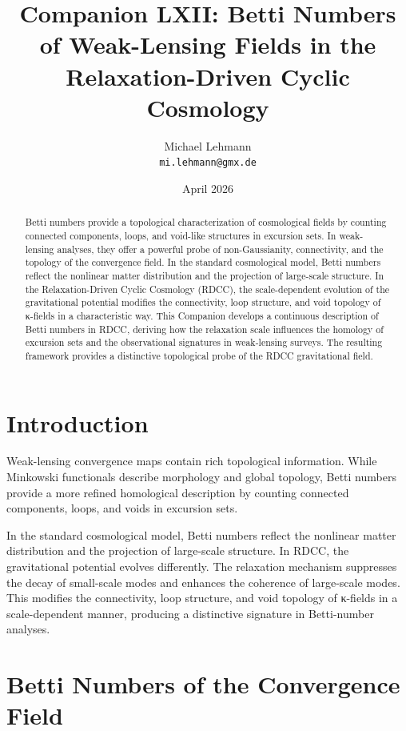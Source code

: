 \documentclass[11pt,a4paper]{article}
\title{\textbf{Companion LXII: Betti Numbers of Weak-Lensing Fields in the Relaxation-Driven Cyclic Cosmology}}
\author{Michael Lehmann \\ \texttt{mi.lehmann@gmx.de}}
\date{April 2026}
\begin{document}
\maketitle

\begin{abstract}
Betti numbers provide a topological characterization of cosmological fields by 
counting connected components, loops, and void-like structures in excursion sets. 
In weak-lensing analyses, they offer a powerful probe of non-Gaussianity, 
connectivity, and the topology of the convergence field. In the standard 
cosmological model, Betti numbers reflect the nonlinear matter distribution and the 
projection of large-scale structure. In the Relaxation-Driven Cyclic Cosmology 
(RDCC), the scale-dependent evolution of the gravitational potential modifies the 
connectivity, loop structure, and void topology of κ-fields in a characteristic 
way. This Companion develops a continuous description of Betti numbers in RDCC, 
deriving how the relaxation scale influences the homology of excursion sets and the 
observational signatures in weak-lensing surveys. The resulting framework provides 
a distinctive topological probe of the RDCC gravitational field.
\end{abstract}
\section{Introduction}

Weak-lensing convergence maps contain rich topological information. While Minkowski 
functionals describe morphology and global topology, Betti numbers provide a more 
refined homological description by counting connected components, loops, and voids 
in excursion sets.

In the standard cosmological model, Betti numbers reflect the nonlinear matter 
distribution and the projection of large-scale structure. In RDCC, the 
gravitational potential evolves differently. The relaxation mechanism suppresses 
the decay of small-scale modes and enhances the coherence of large-scale modes. 
This modifies the connectivity, loop structure, and void topology of κ-fields in a 
scale-dependent manner, producing a distinctive signature in Betti-number 
analyses.
\section{Betti Numbers of the Convergence Field}
\end{document}
